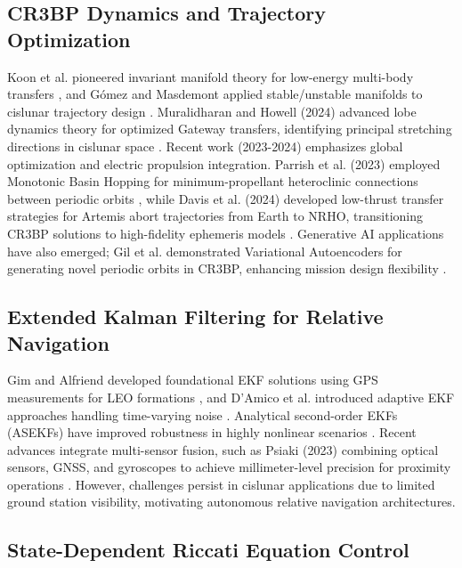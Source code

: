 \documentclass[10pt,letterpaper]{article}
\begin{document}
\subsection{CR3BP Dynamics and Trajectory Optimization}

Koon et al. pioneered invariant manifold theory for low-energy multi-body transfers \cite{koon2000dynamical}, and Gómez and Masdemont applied stable/unstable manifolds to cislunar trajectory design \cite{gomez2001station}. Muralidharan and Howell (2024) advanced lobe dynamics theory for optimized Gateway transfers, identifying principal stretching directions in cislunar space \cite{muralidharan2024stretching}. Recent work (2023-2024) emphasizes global optimization and electric propulsion integration. Parrish et al. (2023) employed Monotonic Basin Hopping for minimum-propellant heteroclinic connections between periodic orbits \cite{parrish2023global}, while Davis et al. (2024) developed low-thrust transfer strategies for Artemis abort trajectories from Earth to NRHO, transitioning CR3BP solutions to high-fidelity ephemeris models \cite{davis2024lowthrust}. Generative AI applications have also emerged; Gil et al. demonstrated Variational Autoencoders for generating novel periodic orbits in CR3BP, enhancing mission design flexibility \cite{mccarthy2024vae}.

\subsection{Extended Kalman Filtering for Relative Navigation}

Gim and Alfriend developed foundational EKF solutions using GPS measurements for LEO formations \cite{gim2003ekf}, and D'Amico et al. introduced adaptive EKF approaches handling time-varying noise \cite{damico2006adaptive}. Analytical second-order EKFs (ASEKFs) have improved robustness in highly nonlinear scenarios \cite{karlgaard2006asekf}. Recent advances integrate multi-sensor fusion, such as Psiaki (2023) combining optical sensors, GNSS, and gyroscopes to achieve millimeter-level precision for proximity operations \cite{psiaki2023fusion}. However, challenges persist in cislunar applications due to limited ground station visibility, motivating autonomous relative navigation architectures.

\subsection{State-Dependent Riccati Equation Control}
\end{document}
